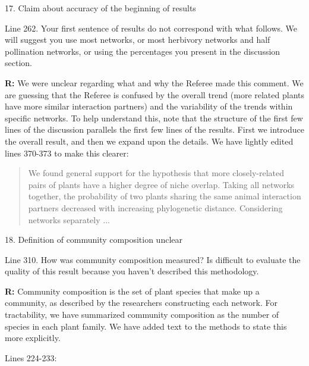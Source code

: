 \documentclass[12pt]{letter}
\newenvironment{refquote}{\bigskip \begin{it}}{\end{it}\smallskip}
\begin{document}
	17. Claim  about accuracy of the beginning of results

		\begin{refquote}
			Line 262. Your first sentence of results do not correspond with what follows. We will suggest you use most networks, or most herbivory networks and half pollination networks, or using the percentages you present in the discussion section.
		\end{refquote}

		\textbf{R:} We were unclear regarding what and why the Referee made this comment. We are guessing that the Referee is confused by the overall trend (more related plants have more similar interaction partners) and the variability of the trends within specific networks. To help understand this, note that the structure of the first few lines of the discussion parallels the first few lines of the results. First we introduce the overall result, and then we expand upon the details. We have lightly edited lines 370-373 to make this clearer:

		\begin{quotation}

			We found general support for the hypothesis that more
			closely-related pairs of plants have a higher degree
			of niche overlap. Taking all networks together, 
			the probability of two plants sharing the same animal 
			interaction partners decreased with increasing 
			phylogenetic distance. Considering networks separately ...

		\end{quotation}


	18. Definition of community composition unclear


		\begin{refquote}
			Line 310. How was community composition measured? Is difficult to evaluate the quality of this result because you haven't described this methodology.
		\end{refquote}


		\textbf{R:} Community composition is the set of plant species that make up a community, as described by the researchers constructing each network. For tractability, we have summarized community composition as the number of species in each plant family. We have added text to the methods to state this more explicitly.


		Lines 224-233:
\end{document}
